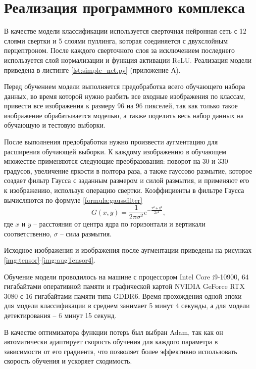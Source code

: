 \section{Реализация программного комплекса}

В качестве модели классификации используется сверточная нейронная сеть с 12 слоями свертки и 5 слоями пуллинга, которая соединяется с двухслойным перцептроном. После каждого сверточного слоя за исключением последнего используется слой нормализации и функция активации ReLU. Реализация модели приведена в листинге \ref{lst:simple_net.py} (приложение А).

Перед обучением модели выполняется предобработка всего обучающего набора данных, во время которой нужно разбить все входные изображения по классам, привести все изображения к размеру 96 на 96 пикселей, так как только такое изображение обрабатывается моделью, а также поделить весь набор данных на обучающую и тестовую выборки.

После выполнения предобработки нужно произвести аугментацию для расширения обучающей выборки. К каждому изображению в обучающем множестве применяются следующие преобразования: поворот на 30 и 330 градусов, увеличение яркости в полтора раза, а также гауссово размытие, которое создает фильтр Гаусса с заданным размером и силой размытия, и применяют его к изображению, используя операцию свертки. Коэффициенты в фильтре Гаусса вычисляются по формуле \ref{formula:gaussfilter}
\begin{equation}\label{formula:gaussfilter}
G(x,y) = \frac{1}{2\pi\sigma^2}e^{-\frac{x^2+y^2}{2\sigma^2}},
\end{equation}
где $x$ и $y$ -- расстояния от центра ядра по горизонтали и вертикали соответственно, $\sigma$ -- сила размытия.

Исходное изображения и изображения после аугментации приведены на рисунках \ref{img:tensor}-\ref{img:augTensor4}.

Обучение модели проводилось на машине с процессором Intel Core i9-10900, 64 гигабайтами оперативной памяти и графической картой NVIDIA GeForce RTX 3080 с 16 гигабайтами памяти типа GDDR6. Время прохождения одной эпохи для модели классификации в среднем занимает 5 минут 4 секунды, а для модели детектирования -- 6 минут 15 секунд.

В качестве оптимизатора функции потерь был выбран Adam, так как он автоматически адаптирует скорость обучения для каждого параметра в зависимости от его градиента, что позволяет более эффективно использовать скорость обучения и ускоряет сходимость.

